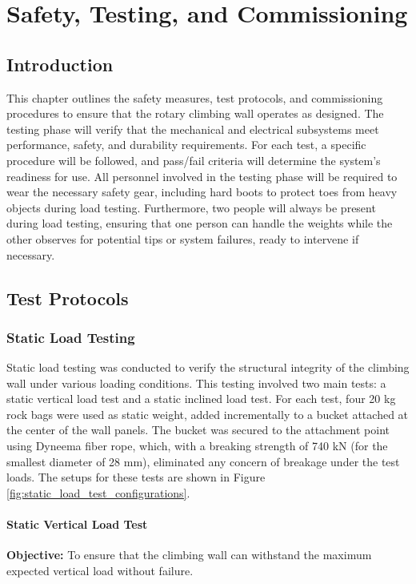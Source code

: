 \chapter{Safety, Testing, and Commissioning}
\label{chap:safety_testing_commissioning}

\section{Introduction}
This chapter outlines the safety measures, test protocols, and commissioning procedures to ensure that the rotary climbing wall operates as designed. The testing phase will verify that the mechanical and electrical subsystems meet performance, safety, and durability requirements. For each test, a specific procedure will be followed, and pass/fail criteria will determine the system's readiness for use. All personnel involved in the testing phase will be required to wear the necessary safety gear, including hard boots to protect toes from heavy objects during load testing. Furthermore, two people will always be present during load testing, ensuring that one person can handle the weights while the other observes for potential tips or system failures, ready to intervene if necessary.

\section{Test Protocols}

\subsection{Static Load Testing}
Static load testing was conducted to verify the structural integrity of the climbing wall under various loading conditions. This testing involved two main tests: a static vertical load test and a static inclined load test. For each test, four 20 kg rock bags were used as static weight, added incrementally to a bucket attached at the center of the wall panels. The bucket was secured to the attachment point using Dyneema fiber rope, which, with a breaking strength of 740 kN (for the smallest diameter of 28 mm), eliminated any concern of breakage under the test loads. The setups for these tests are shown in Figure \ref{fig:static_load_test_configurations}.


\subsubsection{Static Vertical Load Test}
\textbf{Objective:} To ensure that the climbing wall can withstand the maximum expected vertical load without failure.

